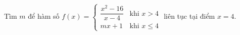 \begin{ex}
Tìm $m$ để hàm số $f(x)=\begin{cases}\dfrac{x^2-16}{x-4}&\text{khi }x>4\\mx+1&\text{khi }x\le4\end{cases}$ liên tục tại điểm $x=4$.
\end{ex}
